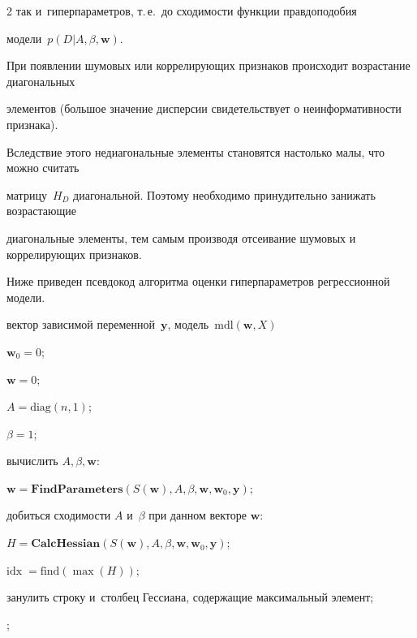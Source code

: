 \begin{multicols}{2}
так и~гиперпараметров, т.\,е.\ до сходимости функции правдоподобия 

модели~$p(D|A,\beta,\mathbf{w})$.



При появлении шумовых или коррелирующих признаков происходит возрастание диагональных 

элементов (большое значение дисперсии свидетельствует о неинформативности признака). 

Вследствие этого недиагональные элементы становятся настолько малы, что можно считать 

матрицу~$H_D$ диагональной. Поэтому необходимо принудительно занижать возрастающие 

диагональные элементы, тем самым производя отсеивание шумовых и коррелирующих признаков.



Ниже приведен псевдокод алгоритма оценки гиперпараметров регрессионной модели.



\begin{algorithmic}

\REQUIRE вектор зависимой переменной~$\mathbf{y}$, модель~$\text{mdl}(\mathbf{w}, X)$

\STATE $\mathbf{w}_0=0$;

\STATE $\mathbf{w}=0$;

\STATE $A = \text{diag}(n,1)$;

\STATE $\beta=1$;

 вычислить $A, \beta, \mathbf{w}:$

    \STATE$\mathbf{w}=\textbf{FindParameters}(S(\mathbf{w}), A, \beta, \mathbf{w}, \mathbf{w}_0, \mathbf{y});$

     добиться сходимости $A$ и~$\beta$ при данном векторе $\mathbf{w}$:

            \STATE$H=\textbf{CalcHessian}(S(\mathbf{w}), A, \beta, \mathbf{w}, \mathbf{w}_0, \mathbf{y});$


                \STATE$\mathrm{idx}\;= \text{find} (\max(H));$ 

                \STATE занулить строку и~столбец Гессиана, содержащие максимальный элемент;

            \ENDIF

            \EXIT ;


\end{algorithmic}
\end{multicols}
